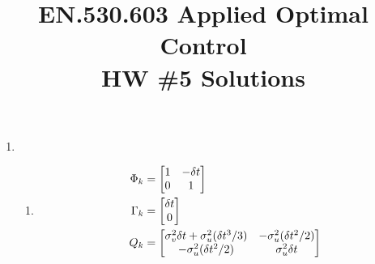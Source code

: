 
\title{EN.530.603 Applied Optimal Control \\HW \#5 Solutions}
\graphicspath{{./figures/}}

\maketitle

\begin{enumerate}
\item 
\begin{enumerate}
\item 
\begin{align*}
 \Phi_k  &= \begin{bmatrix}
            1 & -\delta t \\
            0 & 1
           \end{bmatrix}\\
 \Gamma_k &= \begin{bmatrix}
             \delta t \\ 0
            \end{bmatrix}\\
 \enskip Q_k &= \begin{bmatrix}
                \sigma_v^2 \delta t + \sigma_u^2 (\delta t^3/3) & - \sigma_u^2(\delta t^2/2)\\
                - \sigma_u^2(\delta t^2/2) & \sigma_u^2 \delta t
               \end{bmatrix}
\end{align*}


\end{enumerate}
\end{enumerate}
